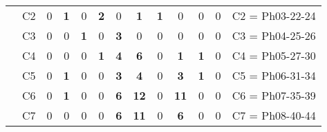 \begin{table}[H]
{\begin{tabular}{|ccrrrrrrrrrrc|}
\multicolumn{1}{|c|}{}                                      & \multicolumn{1}{c|}{C2} & \multicolumn{1}{c|}{0}  & \multicolumn{1}{c|}{\textbf{1}} & \multicolumn{1}{c|}{0}          & \multicolumn{1}{c|}{\textbf{2}} & \multicolumn{1}{c|}{0}          & \multicolumn{1}{c|}{\textbf{1}}  & \multicolumn{1}{c|}{\textbf{1}} & \multicolumn{1}{c|}{0}           & \multicolumn{1}{c|}{0}          & \multicolumn{1}{c|}{0}          & C2 = Ph03-22-24   \\ \cline{2-13}
\multicolumn{1}{|c|}{}                                      & \multicolumn{1}{c|}{C3} & \multicolumn{1}{c|}{0}  & \multicolumn{1}{c|}{0}          & \multicolumn{1}{c|}{\textbf{1}} & \multicolumn{1}{c|}{0}          & \multicolumn{1}{c|}{\textbf{3}} & \multicolumn{1}{c|}{0}           & \multicolumn{1}{c|}{0}          & \multicolumn{1}{c|}{0}           & \multicolumn{1}{c|}{0}          & \multicolumn{1}{c|}{0}          & C3 = Ph04-25-26   \\ \cline{2-13}
\multicolumn{1}{|c|}{}                                      & \multicolumn{1}{c|}{C4} & \multicolumn{1}{c|}{0}  & \multicolumn{1}{c|}{0}          & \multicolumn{1}{c|}{0}          & \multicolumn{1}{c|}{\textbf{1}} & \multicolumn{1}{c|}{\textbf{4}} & \multicolumn{1}{c|}{\textbf{6}}  & \multicolumn{1}{c|}{0}          & \multicolumn{1}{c|}{\textbf{1}}  & \multicolumn{1}{c|}{\textbf{1}} & \multicolumn{1}{c|}{0}          & C4 = Ph05-27-30   \\ \cline{2-13}
\multicolumn{1}{|c|}{}                                      & \multicolumn{1}{c|}{C5} & \multicolumn{1}{c|}{0}  & \multicolumn{1}{c|}{\textbf{1}} & \multicolumn{1}{c|}{0}          & \multicolumn{1}{c|}{0}          & \multicolumn{1}{c|}{\textbf{3}} & \multicolumn{1}{c|}{\textbf{4}}  & \multicolumn{1}{c|}{0}          & \multicolumn{1}{c|}{\textbf{3}}  & \multicolumn{1}{c|}{\textbf{1}} & \multicolumn{1}{c|}{0}          & C5 = Ph06-31-34   \\ \cline{2-13}
\multicolumn{1}{|c|}{}                                      & \multicolumn{1}{c|}{C6} & \multicolumn{1}{c|}{0}  & \multicolumn{1}{c|}{\textbf{1}} & \multicolumn{1}{c|}{0}          & \multicolumn{1}{c|}{0}          & \multicolumn{1}{c|}{\textbf{6}} & \multicolumn{1}{c|}{\textbf{12}} & \multicolumn{1}{c|}{0}          & \multicolumn{1}{c|}{\textbf{11}} & \multicolumn{1}{c|}{0}          & \multicolumn{1}{c|}{0}          & C6 = Ph07-35-39   \\ \cline{2-13}
\multicolumn{1}{|c|}{}                                      & \multicolumn{1}{c|}{C7} & \multicolumn{1}{c|}{0}  & \multicolumn{1}{c|}{0}          & \multicolumn{1}{c|}{0}          & \multicolumn{1}{c|}{0}          & \multicolumn{1}{c|}{\textbf{6}} & \multicolumn{1}{c|}{\textbf{11}} & \multicolumn{1}{c|}{0}          & \multicolumn{1}{c|}{\textbf{6}}  & \multicolumn{1}{c|}{0}          & \multicolumn{1}{c|}{0}          & C7 = Ph08-40-44   \\ \cline{2-13}

\end{tabular}}
\end{table}
